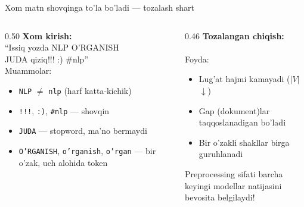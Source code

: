 \documentclass[aspectratio=169,11pt]{beamer}
\begin{document}
\begin{frame}{Xom matn shovqinga to'la bo'ladi --- tozalash shart}
  \begin{columns}[T]
    \begin{column}{0.50\textwidth}
      \textbf{Xom kirish:}\\[4pt]
      \small\ttfamily
      ``Issiq yozda NLP O'RGANISH\\
      JUDA qiziq!!! :) \#nlp''
      \\[7pt]
      \normalfont\small Muammolar:
      \begin{itemize}\footnotesize\setlength\itemsep{2pt}
        \item \texttt{NLP} $\ne$ \texttt{nlp} (harf katta-kichik)
        \item \texttt{!!!}, \texttt{:)}, \texttt{\#nlp} --- shovqin
        \item \texttt{JUDA} --- stopword, ma'no bermaydi
        \item \texttt{O'RGANISH}, \texttt{o'rganish}, \texttt{o'rgan} ---
              bir o'zak, uch alohida token
      \end{itemize}
    \end{column}
    \begin{column}{0.46\textwidth}
      \textbf{Tozalangan chiqish:}\\[4pt]
      \small{}
      \\[7pt]
      \normalfont\small Foyda:
      \begin{itemize}\footnotesize\setlength\itemsep{2pt}
        \item Lug'at hajmi kamayadi ($|V|$ $\downarrow$)
        \item Gap (dokument)lar taqqoslanadigan bo'ladi
        \item Bir o'zakli shakllar birga guruhlanadi
      \end{itemize}
      \begin{tcolorbox}[okbox,top=2pt,bottom=2pt]
        \footnotesize
        Preprocessing sifati barcha\\
        keyingi modellar natijasini\\
        bevosita belgilaydi!
      \end{tcolorbox}
    \end{column}
  \end{columns}
\end{frame}
\end{document}
